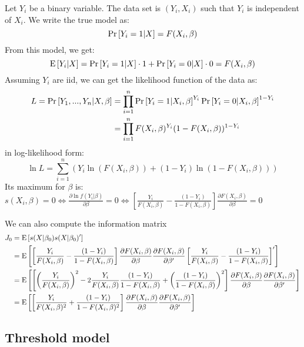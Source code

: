 Let $Y_i$ be a binary variable. The data set is $(Y_i, X_i)$ such that $Y_i$ is independent of $X_i$. We write the true model as: $$\operatorname{Pr}\left[Y_i = 1\vert X\right] = F(X_i, \beta) $$ From this model, we get: $$\operatorname{E}\left[Y_i\vert X\right] = \operatorname{Pr}\left[Y_i = 1\vert X\right]\cdot 1 + \operatorname{Pr}\left[Y_i = 0\vert X\right] \cdot 0 = F(X_i, \beta)$$ Assuming $Y_i$ are iid, we can get the likelihood function of the data as: \begin{align*}
L = \operatorname{Pr}\left[Y_1, ..., Y_n\vert X, \beta\right] & = \prod_{i=1}^{n} \operatorname{Pr}\left[Y_i =1\vert X_i, \beta\right]^{Y_i}\operatorname{Pr}\left[Y_i=0\vert X_i, \beta\right]^{1-Y_i} \\
& = \prod_{i=1}^{n} F(X_i,\beta)^{Y_i} (1 - F(X_i,\beta))^{1 - Y_i}
\end{align*} in log-likelihood form: $$\ln L = \sum_{i=1}^{n} \left(Y_i\ln(F(X_i,\beta)) + (1-Y_i)\ln(1 - F(X_i,\beta))\right) $$ Its maximum for $\beta$ is: $s(X_i,\beta) = 0 \Leftrightarrow \frac{\partial \ln f(Y_i\vert\beta)}{\partial \beta} = 0 \Leftrightarrow \left[\frac{Y_i}{F(X_i,\beta)} - \frac{(1 - Y_i)}{1 - F(X_i,\beta)}\right]\frac{\partial F(X_i,\beta)}{\partial\beta} = 0$

We can also compute the information matrix \begin{align*}
J_0 & = \operatorname{E}\left[s(X\vert\beta_0)s(X\vert\beta_0)'\right] \\ &= \operatorname{E}\left[\left[\frac{Y_i}{F(X_i,\beta)} - \frac{(1 - Y_i)}{1 - F(X_i,\beta)}\right]\frac{\partial F(X_i,\beta)}{\partial\beta} \frac{\partial F(X_i,\beta)}{\partial\beta'}\left[\frac{Y_i}{F(X_i,\beta)} - \frac{(1 - Y_i)}{1 - F(X_i,\beta)}\right]'\right] \\ & = \operatorname{E}\left[\left[\left(\frac{Y_i}{F(X_i,\beta)}\right)^2 - 2\frac{Y_i}{F(X_i,\beta)} \frac{(1 - Y_i)}{1 - F(X_i,\beta)} + \left(\frac{(1 - Y_i)}{1 - F(X_i,\beta)}\right)^2 \right] \frac{\partial F(X_i,\beta)}{\partial\beta} \frac{\partial F(X_i,\beta)}{\partial\beta'}\right] \\ & = \operatorname{E}\left[\left[\frac{Y_i}{F(X_i,\beta)^2} + \frac{(1 - Y_i)}{1 - F(X_i,\beta)^2}\right] \frac{\partial F(X_i,\beta)}{\partial\beta} \frac{\partial F(X_i,\beta)}{\partial\beta'}\right]
\end{align*}

\subsection{Threshold model}